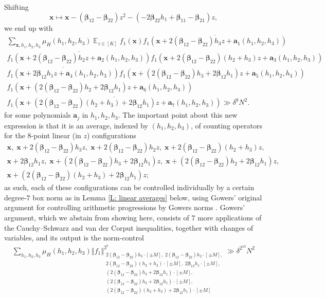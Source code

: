 \documentclass[11pt]{amsart}
\theoremstyle{definition}
\DeclareMathOperator*{\E}{\mathbb{E}}
\newcommand{\ba}{{\mathbf{a}}}
\newcommand{\bx}{{\mathbf{x}}}
\newcommand{\bbeta}{{\boldsymbol{\beta}}}
\newcommand{\norm}[1]{\left\Vert #1\right\Vert}
\begin{document}
Shifting $$\bx\mapsto \bx - (\bbeta_{12}-\bbeta_{22})z^2 - (-2\bbeta_{22}h_1+\bbeta_{11}-\bbeta_{21})z,$$ we end up with
\begin{multline*}
    \sum_{\bx, h_1, h_2, h_3}\mu_H(h_1, h_2, h_3)\E_{z\in[K]}f_1(\bx)
    \overline{f_1(\bx + 2(\bbeta_{12}-\bbeta_{22})h_3 z+\ba_1(h_1, h_2, h_3))}\\
    \overline{f_1(\bx + 2(\bbeta_{12}-\bbeta_{22})h_2 z+\ba_2(h_1, h_2, h_3))}
    {f_1(\bx + 2(\bbeta_{12}-\bbeta_{22})(h_2+h_3)z + \ba_3(h_1, h_2, h_3))}\\
    \overline{f_1(\bx +2\bbeta_{12}h_1z + \ba_4(h_1,h_2, h_3))}
    {f_1(\bx + (2(\bbeta_{12}-\bbeta_{22})h_3 + 2\bbeta_{12}h_1)z + \ba_5(h_1,h_2, h_3))}\\
    {f_1(\bx + (2(\bbeta_{12}-\bbeta_{22})h_2 + 2\bbeta_{12}h_1)z +  \ba_6(h_1,h_2, h_3))}\\
    \overline{f_1(\bx + (2(\bbeta_{12}-\bbeta_{22})(h_2+h_3) + 2\bbeta_{12}h_1) z +  \ba_7(h_1,h_2, h_3))}\gg \delta^8 N^2.
\end{multline*}
for some polynomials $\ba_j$ in $h_1, h_2, h_3$. The important point about this new expression is that it is an average, indexed by $(h_1, h_2, h_3)$, of counting operators for the $8$-point linear (in $z$) configurations
\begin{gather*}
    \bx,\; \bx + 2(\bbeta_{12}-\bbeta_{22})h_3 z,\; \bx + 2(\bbeta_{12}-\bbeta_{22})h_2 z,\; \bx + 2(\bbeta_{12}-\bbeta_{22})(h_2+h_3)z,\\ \bx +2\bbeta_{12}h_1z,\;  \bx + (2(\bbeta_{12}-\bbeta_{22})h_3 + 2\bbeta_{12}h_1)z,\; \bx + (2(\bbeta_{12}-\bbeta_{22})h_2 + 2\bbeta_{12}h_1)z,\\ \bx + (2(\bbeta_{12}-\bbeta_{22})(h_2+h_3) + 2\bbeta_{12}h_1) z;
\end{gather*}
as such, each of these configurations can be controlled individually by a certain degree-$7$ box norm as in Lemma \ref{L: linear averages} below, using Gowers' original argument for controlling arithmetic progressions by Gowers norms \cite{Go98a, Go01}. Gowers' argument, which we abstain from showing here, consists of $7$ more applications of the Cauchy--Schwarz and van der Corput inequalities, together with changes of variables, and its output is the norm-control
\begin{align*}
     \sum_{h_1, h_2, h_3}\mu_H(h_1, h_2, h_3)\norm{f_1}^{2^7}_{\substack{2(\bbeta_{12}-\bbeta_{22})h_3\cdot[\pm M],\; 2(\bbeta_{12}-\bbeta_{22})h_2\cdot[\pm M],\\ 2(\bbeta_{12}-\bbeta_{22})(h_2+h_3)\cdot[\pm M],\; 2\bbeta_{12}h_1\cdot[\pm M],\\ (2(\bbeta_{12}-\bbeta_{22})h_3 + 2\bbeta_{12}h_1)\cdot[\pm M],\\ (2(\bbeta_{12}-\bbeta_{22})h_2 + 2\bbeta_{12}h_1)\cdot[\pm M],\\  (2(\bbeta_{12}-\bbeta_{22})(h_2+h_3) + 2\bbeta_{12}h_1)\cdot[\pm M]}}\gg \delta^{2^{10}}N^2
\end{align*}
\end{document}

